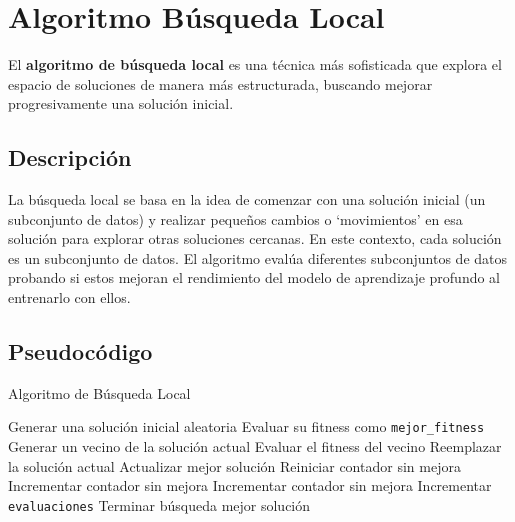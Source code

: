 \section{Algoritmo Búsqueda Local}\label{sec:algoritmo-busqueda-local}
El \textbf{algoritmo de búsqueda local} es una técnica más sofisticada que explora el espacio de soluciones de manera
más estructurada, buscando mejorar progresivamente una solución inicial.

\subsection{Descripción}\label{subsec:descripcion-busqueda-local}
La búsqueda local se basa en la idea de comenzar con una solución inicial (un subconjunto de datos) y realizar pequeños
cambios o `movimientos' en esa solución para explorar otras soluciones cercanas.
En este contexto, cada solución es un subconjunto de datos.
El algoritmo evalúa diferentes subconjuntos de datos probando si estos mejoran el rendimiento del modelo de aprendizaje
profundo al entrenarlo con ellos.


\subsection{Pseudocódigo}\label{subsec:Pseudocodigo-busqueda-local}
\begin{algorithm}[htp]
      \caption{Algoritmo de Búsqueda Local}
      \label{alg:busqueda-local}
      \begin{algorithmic}[1]
            \State Generar una solución inicial aleatoria
            \State Evaluar su fitness como \texttt{mejor\_fitness}
            \State Generar un vecino de la solución actual
            \State Evaluar el fitness del vecino
            \State Reemplazar la solución actual
            \State Actualizar mejor solución
            \State Reiniciar contador sin mejora
            \Else
            \State Incrementar contador sin mejora
            \EndIf
            \Else
            \State Incrementar contador sin mejora
            \EndIf
            \State Incrementar \texttt{evaluaciones}
            \State Terminar búsqueda
            \EndIf
            \EndWhile
            \State \Return mejor solución
      \end{algorithmic}
\end{algorithm}

